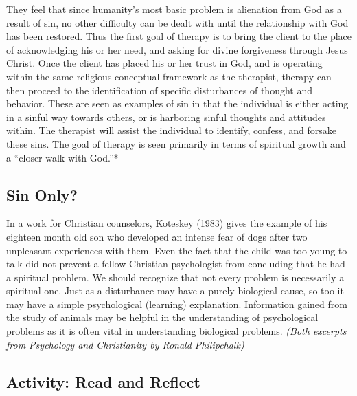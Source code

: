 \documentclass[
]{book}
\begin{document}
They feel that since humanity's most basic problem is alienation from God as a result of sin, no other difficulty can be dealt with until the relationship with God has been restored. Thus the first goal of therapy is to bring the client to the place of acknowledging his or her need, and asking for divine forgiveness through Jesus Christ. Once the client has placed his or her trust in God, and is operating within the same religious conceptual framework as the therapist, therapy can then proceed to the identification of specific disturbances of thought and behavior. These are seen as examples of sin in that the individual is either acting in a sinful way towards others, or is harboring sinful thoughts and attitudes within. The therapist will assist the individual to identify, confess, and forsake these sins. The goal of therapy is seen primarily in terms of spiritual growth and a ``closer walk with God.''*

\hypertarget{sin-only}{%
\subsection*{Sin Only?}\label{sin-only}}

In a work for Christian counselors, Koteskey (1983) gives the example of his eighteen month old son who developed an intense fear of dogs after two unpleasant experiences with them. Even the fact that the child was too young to talk did not prevent a fellow Christian psychologist from concluding that he had a spiritual problem. We should recognize that not every problem is necessarily a spiritual one. Just as a disturbance may have a purely biological cause, so too it may have a simple psychological (learning) explanation. Information gained from the study of animals may be helpful in the understanding of psychological problems as it is often vital in understanding biological problems. \emph{(Both excerpts from Psychology and Christianity by Ronald Philipchalk)}

\hypertarget{activity-read-and-reflect-19}{%
\subsection*{Activity: Read and Reflect}\label{activity-read-and-reflect-19}}
\end{document}
